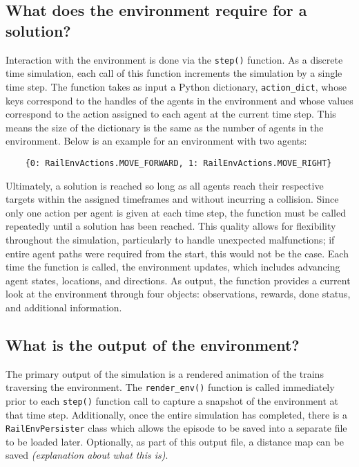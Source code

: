
\subsection{What does the environment require for a solution?}
Interaction with the environment is done via the \texttt{step()} function.  As a discrete time simulation, each call of this function increments the simulation by a single time step.  
The function takes as input a Python dictionary, \texttt{action\_dict}, whose keys correspond to the handles of the agents in the environment and whose values correspond to the action assigned to each agent at the current time step.  
This means the size of the dictionary is the same as the number of agents in the environment.  
Below is an example for an environment with two agents:
	\begin{verbatim}
	{0: RailEnvActions.MOVE_FORWARD, 1: RailEnvActions.MOVE_RIGHT}
	\end{verbatim}


\noindent Ultimately, a solution is reached so long as all agents reach their respective targets within the assigned timeframes and without incurring a collision.  
Since only one action per agent is given at each time step, the function must be called repeatedly until a solution has been reached.  
This quality allows for flexibility throughout the simulation, particularly to handle unexpected malfunctions; if entire agent paths were required from the start, this would not be the case.  
Each time the function is called, the environment updates, which includes advancing agent states, locations, and directions. 
As output, the function provides a current look at the environment through four objects: observations, rewards, done status, and additional information.

\subsection{What is the output of the environment?}
The primary output of the simulation is a rendered animation of the trains traversing the environment.  
The \texttt{render\_env()} function is called immediately prior to each \texttt{step()} function call to capture a snapshot of the environment at that time step.  
Additionally, once the entire simulation has completed, there is a \texttt{RailEnvPersister} class which allows the episode to be saved into a separate file to be loaded later.  
Optionally, as part of this output file, a distance map can be saved \textit{(explanation about what this is)}.

